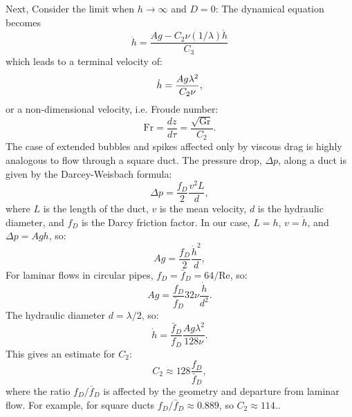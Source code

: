 Next, Consider the limit when $h \rightarrow \infty$ and $D = 0$:
The dynamical equation becomes
\begin{equation}
\ddot{h} = \frac{A g - C_2 \nu (1/\lambda) \dot{h}}{C_3}
\end{equation}
which leads to a terminal velocity of:
\begin{equation} \elabel{visc_vel}
\dot{h} = \frac{A g \lambda^2 }{C_2 \nu},
\end{equation}
or a non-dimensional velocity, i.e. Froude number:
\begin{equation}
\text{Fr} = \frac{d z}{d \tau} = \frac{\sqrt{\text{Gr}}}{C_2}.
\end{equation}
The case of extended bubbles and spikes affected only by viscous drag is highly analogous to flow through a square duct.
The pressure drop, $\Delta p$, along a duct is given by the Darcey-Weisbach formula:
\begin{equation}
\Delta p = \frac{f_D}{2} \frac{v^2 L}{d},
\end{equation}
where $L$ is the length of the duct,
$v$ is the mean velocity,
$d$ is the hydraulic diameter,
and $f_D$ is the Darcy friction factor.
In our case, $L = h$, $v = \dot{h}$, and $\Delta p = A g h$, so:
\begin{equation}
A g = \frac{f_D}{2} \frac{\dot{h}^2}{d},
\end{equation}
For laminar flows in circular pipes, $f_D = \bar{f}_D = 64 / \text{Re}$, so:
\begin{equation}
A g = \frac{f_D}{\bar{f}_D} 32 \nu \frac{\dot{h}}{d^2}.
\end{equation}
The hydraulic diameter $d = \lambda / 2$, so:
\begin{equation}
\dot{h} = \frac{\bar{f}_D}{f_D} \frac{A g \lambda^2}{128 \nu} .
\end{equation}
This gives an estimate for $C_2$:
\begin{equation}
C_2 \approx 128 \frac{f_D}{\bar{f}_D},
\end{equation}
where the ratio $f_D / \bar{f}_D$ is affected by the geometry and departure from laminar flow.
For example, for square ducts $f_D/\bar{f}_D \approx 0.889$, so $C_2 \approx 114.$. 

